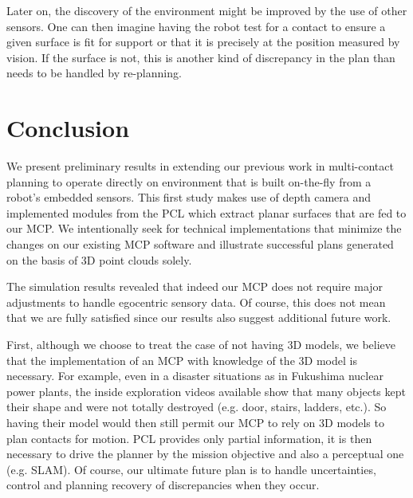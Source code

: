 Later on, the discovery of the environment might be improved by the use of other sensors. One can then imagine having the robot test for a contact to ensure a given surface is fit for support or that it is precisely at the position measured by vision. If the surface is not, this is another kind of discrepancy in the plan than needs to be handled by re-planning. 

\section{Conclusion}
We present preliminary results in extending our previous work in multi-contact planning to operate directly on environment that is built on-the-fly from a robot's embedded sensors. This first study makes use of depth camera and implemented modules from the PCL which extract planar surfaces that are fed to our MCP. We intentionally seek for technical implementations that minimize the changes on our existing MCP software and illustrate successful plans generated on the basis of 3D point clouds solely. 

The simulation results revealed that indeed our MCP does not require major adjustments to handle egocentric sensory data. Of course, this does not mean that we are fully satisfied since our results also suggest additional future work. 

First, although we choose to treat the case of not having 3D models, we believe that the implementation of an MCP with knowledge of the 3D model is necessary. For example, even in a disaster situations as in Fukushima nuclear power plants, the inside exploration videos available show that many objects kept their shape and were not totally destroyed (e.g. door, stairs, ladders, etc.). So having their model would then still permit our MCP to rely on 3D models to plan contacts for motion. PCL provides only partial information, it is then necessary to drive the planner by the mission objective and also a perceptual one (e.g. SLAM). Of course, our ultimate future plan is to handle uncertainties, control and planning recovery of discrepancies when they occur.

